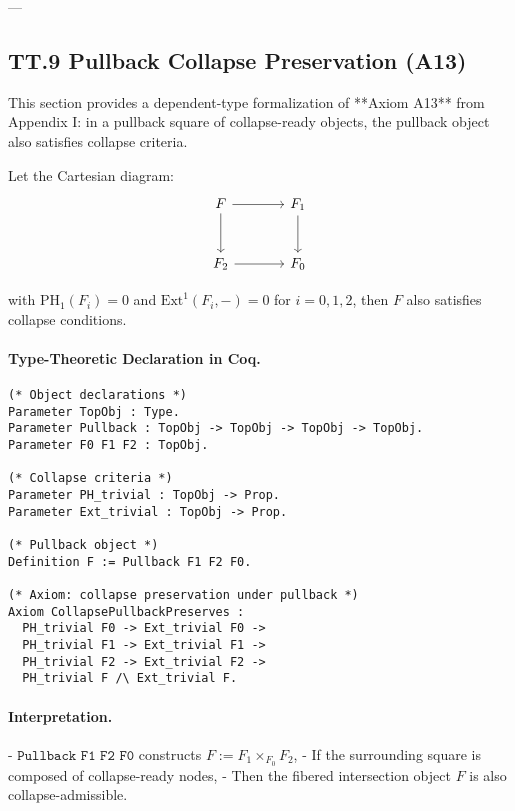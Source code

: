 \documentclass[11pt]{article}
\begin{document}
{---

\subsection*{TT.9 Pullback Collapse Preservation (A13)}

This section provides a dependent-type formalization of **Axiom A13** from Appendix I:  
in a pullback square of collapse-ready objects, the pullback object also satisfies collapse criteria.

Let the Cartesian diagram:
\[
\begin{tikzcd}[row sep=large, column sep=large]
F \arrow[r] \arrow[d] & F_1 \arrow[d] \\
F_2 \arrow[r] & F_0
\end{tikzcd}
\]

with \( \mathrm{PH}_1(F_i) = 0 \) and \( \mathrm{Ext}^1(F_i, -) = 0 \) for \( i = 0, 1, 2 \),  
then \( F \) also satisfies collapse conditions.

\paragraph{Type-Theoretic Declaration in Coq.}

\begin{lstlisting}[language=Coq]
(* Object declarations *)
Parameter TopObj : Type.
Parameter Pullback : TopObj -> TopObj -> TopObj -> TopObj.
Parameter F0 F1 F2 : TopObj.

(* Collapse criteria *)
Parameter PH_trivial : TopObj -> Prop.
Parameter Ext_trivial : TopObj -> Prop.

(* Pullback object *)
Definition F := Pullback F1 F2 F0.

(* Axiom: collapse preservation under pullback *)
Axiom CollapsePullbackPreserves :
  PH_trivial F0 -> Ext_trivial F0 ->
  PH_trivial F1 -> Ext_trivial F1 ->
  PH_trivial F2 -> Ext_trivial F2 ->
  PH_trivial F /\ Ext_trivial F.
\end{lstlisting}

\paragraph{Interpretation.}
- \( \texttt{Pullback F1 F2 F0} \) constructs \( F := F_1 \times_{F_0} F_2 \),
- If the surrounding square is composed of collapse-ready nodes,
- Then the fibered intersection object \( F \) is also collapse-admissible.

}
\end{document}
